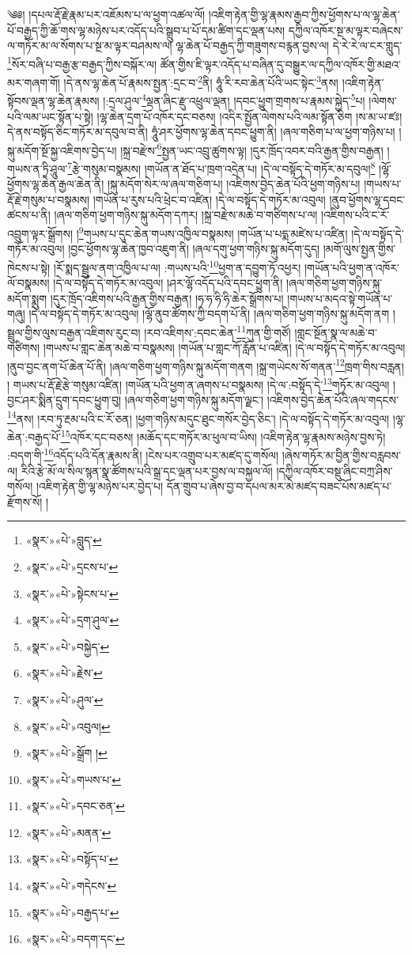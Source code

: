 ༄༅། །དཔལ་རྡོ་རྗེ་རྣམ་པར་འཇོམས་པ་ལ་ཕྱག་འཚལ་ལོ། །འཇིག་རྟེན་གྱི་ལྷ་རྣམས་རྒྱབ་ཀྱིས་ཕྱོགས་པ་ལ་ལྷ་ཆེན་པོ་བརྒྱད་ཀྱི་ཆོ་གས་ལྷ་མཉེས་པར་འདོད་པའི་སྒྲུབ་པ་པོ་དམ་ཚིག་དང་ལྡན་པས། དཀྱིལ་འཁོར་སྔ་མ་ལྟར་བཞེངས་ལ་གཏོར་མ་ལ་སོགས་པ་སྔ་མ་ལྟར་བཤམས་ལ། ལྷ་ཆེན་པོ་བརྒྱད་ཀྱི་གཟུགས་བརྙན་བྱས་ལ། དེ་རེ་རེ་ལ་ངར་གླུད་\footnote{«སྣར་»«པེ་»བླུད་}སོར་བཞི་པ་བརྒྱ་རྩ་བརྒྱད་ཀྱིས་བསྐོར་ལ། ཚོན་གྱིས་ཇི་ལྟར་འདོད་པ་བཞིན་དུ་བསྒྱུར་ལ་དཀྱིལ་འཁོར་གྱི་མཐའ་མར་གཞག་གོ། །དེ་ནས་ལྷ་ཆེན་པོ་རྣམས་སྤྱན་:དྲང་བ་\footnote{«སྣར་»«པེ་»དྲངས་པ་}ནི། ཧཱུཾ་རི་རབ་ཆེན་པོའི་ཡང་སྟེང་\footnote{«སྣར་»«པེ་»སྟེངས་པ་}ནས། །འཇིག་རྟེན་སྟོབས་ལྡན་ལྷ་ཆེན་རྣམས། །:དྲལ་ཤུལ་\footnote{«སྣར་»«པེ་»དྲག་ཤུལ་}ལྡན་ཞིང་རྫུ་འཕྲུལ་ལྡན། །དབང་ཕྱུག་གྲགས་པ་རྣམས་སྐྱེད་\footnote{«སྣར་»«པེ་»བསྐྱེད་}པ། །ལེགས་པའི་ལམ་ཡང་སྟོན་པ་སྟེ། །ལྷ་ཆེན་དྲག་པོ་འཁོར་དང་བཅས། །འདིར་སྤྱོན་ལེགས་པའི་ལམ་སྟོན་ཅིག །ས་མ་ཡ་ཛཿ། དེ་ནས་བསྟོད་ཅིང་གཏོར་མ་དབུལ་བ་ནི། ཧཱུཾ་ཤར་ཕྱོགས་ལྷ་ཆེན་དབང་ཕྱུག་ནི། །ཞལ་གཅིག་པ་ལ་ཕྱག་གཉིས་པ། །སྐུ་མདོག་སྔོ་སྐྱ་འཇིགས་བྱེད་པ། །སྐྲ་བརྫེས་\footnote{«སྣར་»«པེ་»རྗེས་}སྤྱན་ཡང་འབྲུ་ཚུགས་ལྟ། །དུར་ཁྲོད་འབར་བའི་རྒྱན་གྱིས་བརྒྱན། །གཡས་ན་ཏྲི་ཤཱུལ་\footnote{«སྣར་»«པེ་»ཤུལ་}རྩེ་གསུམ་བསྣམས། །གཡོན་ན་ཐོད་པ་ཁྲག་འདྲེན་པ། །དེ་ལ་བསྟོད་དེ་གཏོར་མ་དབུལ།\footnote{«སྣར་»«པེ་»འབུལ།} །ལྷོ་ཕྱོགས་ལྷ་ཆེན་རྒྱལ་ཆེན་ནི། །སྐུ་མདོག་སེར་ལ་ཞལ་གཅིག་པ། །འཇིགས་བྱེད་ཆེན་པོའི་ཕྱག་གཉིས་པ། །གཡས་པ་རྡོ་རྗེ་གསུམ་པ་བསྣམས། །གཡོན་པ་རུས་པའི་ཕྲེང་བ་འཛིན། །དེ་ལ་བསྟོད་དེ་གཏོར་མ་འབུལ། །ནུབ་ཕྱོགས་ལྷ་དབང་ཚངས་པ་ནི། །ཞལ་གཅིག་ཕྱག་གཉིས་སྐུ་མདོག་དཀར། །སྐྲ་བརྫེས་མཆེ་བ་གཙིགས་པ་ལ། །འཇིགས་པའི་ང་རོ་འབྲུག་ལྟར་སྒྲོགས། །\footnote{«སྣར་»«པེ་»སྒྲོག །}གཡས་པ་དུང་ཆེན་གཡས་འཁྱིལ་བསྣམས། །གཡོན་པ་པདྨ་མཛེས་པ་འཛིན། །དེ་ལ་བསྟོད་དེ་གཏོར་མ་འབུལ། །བྱང་ཕྱོགས་ལྷ་ཆེན་ཁྱབ་འཇུག་ནི། །ཞལ་དགུ་ཕྱག་གཉིས་སྐུ་མདོག་དུད། །མགོ་ལུས་སྤྱན་གྱིས་ཁེངས་པ་སྟེ། །རོ་སྨད་སྦྲུལ་ནག་འཁྱིལ་པ་ལ། :གཡས་པའི་\footnote{«སྣར་»«པེ་»གཡས་པ་}ཕྱག་ན་དབྱུག་ཏོ་འཕྱར། །གཡོན་པའི་ཕྱག་ན་འཁོར་ལོ་བསྣམས། །དེ་ལ་བསྟོད་དེ་གཏོར་མ་འབུལ། །ཤར་ལྷོ་འདོད་པའི་དབང་ཕྱུག་ནི། །ཞལ་གཅིག་ཕྱག་གཉིས་སྐུ་མདོག་སྨུག །དུར་ཁྲོད་འཇིགས་པའི་རྒྱན་གྱིས་བརྒྱན། །ཧ་ཧ་ཧི་ཧི་ཆེར་སྒྲོགས་པ། །གཡས་པ་མདའ་སྟེ་གཡོན་པ་གཞུ། །དེ་ལ་བསྟོད་དེ་གཏོར་མ་འབུལ། །ལྷོ་ནུབ་ཚོགས་ཀྱི་བདག་པོ་ནི། །ཞལ་གཅིག་ཕྱག་གཉིས་སྐུ་མདོག་ནག །སྦྲུལ་གྱིས་ལུས་བརྒྱན་འཇིགས་རུང་བ། །རབ་འཇིགས་:དབང་ཆེན་\footnote{«སྣར་»«པེ་»དབང་ཅན་}ཀུན་གྱི་གཙོ། །གླང་སྔོན་སྣ་ལ་མཆེ་བ་གཙིགས། །གཡས་པ་གླང་ཆེན་མཆེ་བ་བསྣམས། །གཡོན་པ་གླང་ཀོ་རློན་པ་འཛིན། །དེ་ལ་བསྟོད་དེ་གཏོར་མ་འབུལ། །ནུབ་བྱང་ནག་པོ་ཆེན་པོ་ནི། །ཞལ་གཅིག་ཕྱག་གཉིས་སྐུ་མདོག་གནག །སྐྲ་གཡེངས་སོ་གནན་\footnote{«སྣར་»«པེ་»མནན་}ཁྲག་གིས་བརླན། །
གཡས་པ་རྡོ་རྗེ་རྩེ་གསུམ་འཛིན། །གཡོན་པའི་ཕྱག་ན་ཞགས་པ་བསྣམས། །དེ་ལ་:བསྟོད་དེ་\footnote{«སྣར་»«པེ་»བསྟོད་པ་}གཏོར་མ་འབུལ། །བྱང་ཤར་སྨིན་དྲུག་དབང་ཕྱུག་བུ། །ཞལ་གཅིག་ཕྱག་གཉིས་སྐུ་མདོག་ལྗང་། །འཇིགས་བྱེད་ཆེན་པོའི་ཞལ་གདངས་\footnote{«སྣར་»«པེ་»གདེངས་}ནས། །རབ་ཏུ་རྔམ་པའི་ང་རོ་ཅན། །ཕྱག་གཉིས་མདུང་ཐུང་གསོར་བྱེད་ཅིང་། །དེ་ལ་བསྟོད་དེ་གཏོར་མ་འབུལ། །ལྷ་ཆེན་:བརྒྱད་པོ་\footnote{«སྣར་»«པེ་»བརྒྱད་པ་}འཁོར་དང་བཅས། །མཆོད་དང་གཏོར་མ་ཕུལ་བ་ཡིས། །འཇིག་རྟེན་ལྷ་རྣམས་མཉེས་བྱས་ཏེ། :བདག་གི་\footnote{«སྣར་»«པེ་»བདག་དང་}འདོད་པའི་དོན་རྣམས་ནི། །ངེས་པར་འགྲུབ་པར་མཛད་དུ་གསོལ། །ཞེས་གཏོར་མ་བྱིན་གྱིས་བརླབས་ལ། རིའི་རྩེ་མོ་ལ་སིལ་སྙན་སྣ་ཚོགས་པའི་སྒྲ་དང་ལྡན་པར་བྱས་ལ་བསྐྱལ་ལོ། །དཀྱིལ་འཁོར་བསྡུ་ཞིང་བཀྲ་ཤིས་གསོལ། །འཇིག་རྟེན་གྱི་ལྷ་མཉེས་པར་བྱེད་པ། དོན་གྲུབ་པ་ཞེས་བྱ་བ་དཔལ་མར་མེ་མཛད་བཟང་པོས་མཛད་པ་རྫོགས་སོ། ། 